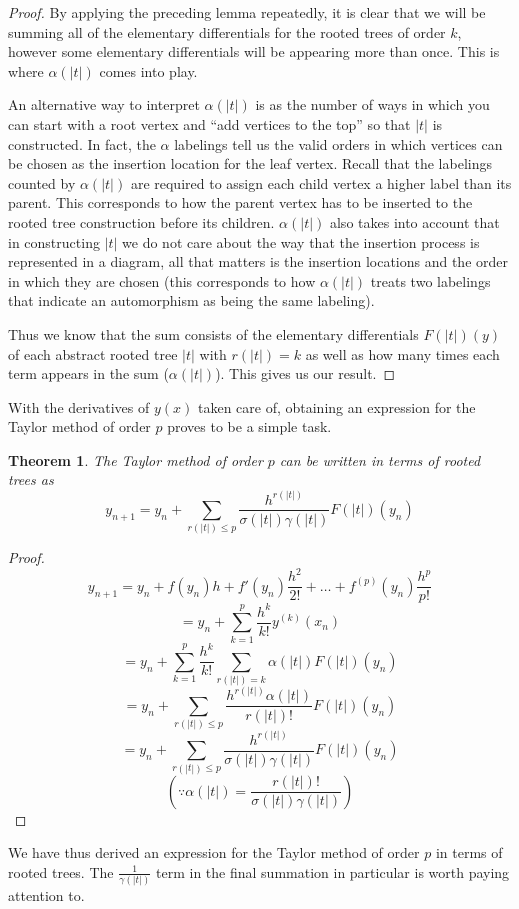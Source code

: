 \documentclass[12pt]{amsart}
\newtheorem*{theorem}{Theorem}
\theoremstyle{definition}
\begin{document}
  \begin{proof}
	By applying the preceding lemma repeatedly, it is clear that we will be summing all of the elementary differentials
	for the rooted trees of order $k$, however some elementary differentials will be appearing more than once. 
	This is where $\alpha(|t|)$ comes into play.

	An alternative way to interpret $\alpha(|t|)$ is as the number of ways in which you can start with a root vertex and
	``add vertices to the top'' so that $|t|$ is constructed. In fact, the $\alpha$ labelings tell us the valid orders in which 
	vertices can be chosen as the insertion location for the leaf vertex. 
	Recall that the labelings counted by $\alpha(|t|)$ are required to 
	assign each child vertex a higher label than its parent. This corresponds to how the parent vertex has to be
	inserted to the rooted tree construction before its children. $\alpha(|t|)$ also takes into account that in constructing $|t|$
	we do not care about the way that the insertion process is represented in a diagram, all that matters is the insertion locations
	and the order in which they are chosen (this corresponds to how $\alpha(|t|)$ treats two labelings that indicate
	an automorphism as being the same labeling).  
	
	Thus we know that the sum consists of the elementary differentials $F(|t|)(y)$  of each abstract rooted tree
	$|t|$ with $r(|t|) = k$ as well as how many times each term appears in the sum ($\alpha(|t|)$). 
	This gives us our result.
  \end{proof}
  
  With the derivatives of $y(x)$ taken care of, obtaining an expression for the Taylor method of order $p$ proves
  to be a simple task.
  
  \begin{theorem}
	The Taylor method of order $p$ can be written in terms of rooted trees as
	$$y_{n + 1} = y_n + \sum_{r(|t|) \le p}{\frac{h^{r(|t|)}}{\sigma(|t|)\gamma(|t|)}F(|t|)(y_n)}$$ 
  \end{theorem}
  \begin{proof}
  	 $$y_{n+1} = y_n + f(y_n)h + f'(y_n)\frac{h^2}{2!} + \dots + f^{(p)}(y_n)\frac{h^{p}}{p!}$$
  	 $$= y_n + \sum_{k = 1}^{p}{\frac{h^k}{k!}y^{(k)}(x_n)}$$
  	 $$= y_n + \sum_{k = 1}^{p}{\frac{h^k}{k!} \sum_{r(|t|) = k}{\alpha(|t|)F(|t|)(y_n)}}$$
  	 $$= y_n + \sum_{r(|t|) \le p}{\frac{h^{r(|t|)}\alpha(|t|)}{r(|t|)!}F(|t|)(y_n)}$$
  	 $$= y_n + \sum_{r(|t|) \le p}{\frac{h^{r(|t|)}}{\sigma(|t|)\gamma(|t|)}F(|t|)(y_n)}$$ 
  	 $$ (\because \alpha(|t|) = \frac{r(|t|)!}{\sigma(|t|)\gamma(|t|)})$$
  \end{proof}
  We have thus derived an expression for the Taylor method of order $p$ in terms of rooted trees.
  The $\frac{1}{\gamma(|t|)}$ term in the final summation in particular is worth paying attention to.
  
\end{document}
